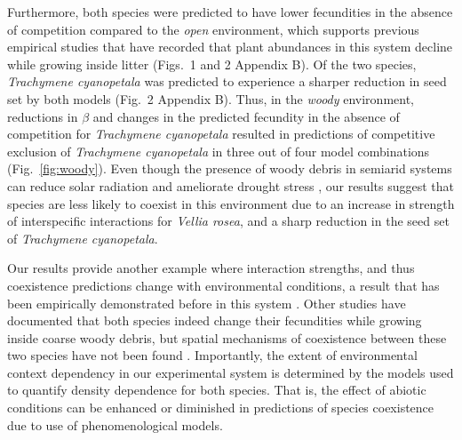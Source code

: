 \begin{refsection}
Furthermore, both species were predicted to have lower fecundities in the absence of competition compared to the \textit{open} environment, which supports previous empirical studies that have recorded that plant abundances in this system decline while growing inside litter \citep{wainwright2017effects} (Figs.~1 and 2 Appendix B). Of the two species, \textit{Trachymene cyanopetala} was predicted to experience a sharper reduction in seed set by both models (Fig.~2 Appendix B). Thus, in the \textit{woody} environment, reductions in $\beta$ and changes in the predicted fecundity in the absence of competition for \textit{Trachymene cyanopetala} resulted in predictions of competitive exclusion of \textit{Trachymene cyanopetala} in three out of four model combinations (Fig.~\ref{fig:woody}). Even though the presence of woody debris in semiarid systems can reduce solar radiation and ameliorate drought stress \citep{wainwright2017effects}, our results suggest that species are less likely to coexist in this environment due to an increase in strength of interspecific interactions for \textit{Vellia rosea}, and a sharp reduction in the seed set of \textit{Trachymene cyanopetala}.

Our results  provide another example where interaction strengths, and thus coexistence predictions change with environmental conditions, a result that has been empirically demonstrated before in this system \citep{mayfield2017higher,wainwright2017diverse,bimler_accurate_2018}. Other studies have documented that both species indeed change their fecundities while growing inside coarse woody debris, but spatial mechanisms of coexistence between these two species have not been found \citep{towers2020requirements}. Importantly, the extent of environmental context dependency in our experimental system is determined by the models used to quantify density dependence for both species. That is, the effect of abiotic conditions can be enhanced or diminished in predictions of species coexistence due to use of phenomenological models.





\end{refsection}
